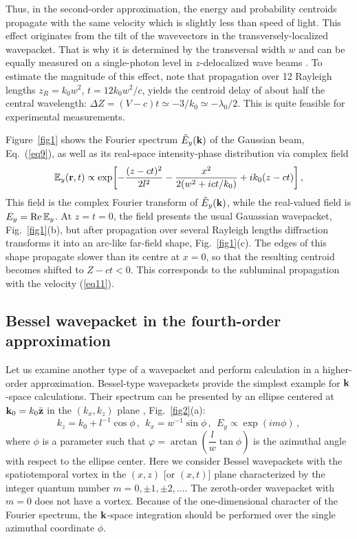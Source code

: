 \documentclass[12pt, a4paper, superscriptaddress, final]{iopart}
\begin{document}
Thus, in the second-order approximation, the energy and probability centroids propagate with the same velocity which is slightly less than speed of light. This effect originates from the tilt of the wavevectors in the transversely-localized wavepacket. That is why it is determined by the transversal width $w$ and can be equally measured on a single-photon level in $z$-delocalized wave beams \cite{Giovannini2015}.
To estimate the magnitude of this effect, note that propagation over 12 Rayleigh lengths $z_R = k_0 w^2$, $t = 12 k_0 w^2 / c$, yields the centroid delay of about half the central wavelength: $\Delta Z = (V-c)t \simeq - 3/ k_0 \simeq - \lambda_0/2$. This is quite feasible for experimental measurements.

Figure~\ref{fig1} shows the Fourier spectrum $\tilde{E}_y ({\bf k})$ of the Gaussian beam, Eq.~(\ref{eq9}), as well as its real-space intensity-phase distribution via complex field \cite{Siegman_book}
%
\begin{equation}
\label{eq12}
{\mathbb E}_y ({\bf r},t) \propto \exp\!\left[ -\frac{(z-ct)^2}{2 l^2} - \frac{x^2 }{2(w^2+i c t/k_0)} + i k_0 (z-ct)\right],
 \end{equation}
%	
This field is the complex Fourier transform of $\tilde{E}_y ({\bf k})$, while the real-valued field is $E_y = {\rm Re}\, {\mathbb E}_y$. At $z=t=0$, the field presents the usual Gauassian wavepacket, Fig.~\ref{fig1}(b), but after propagation over several Rayleigh lengths diffraction transforms it into an arc-like far-field shape, Fig.~\ref{fig1}(c). The edges of this shape propagate slower than its centre at $x=0$, so that the resulting centroid becomes shifted to $Z - ct < 0$. This corresponds to the subluminal propagation with the velocity (\ref{eq11}). 

\subsection{Bessel wavepacket in the fourth-order approximation}

Let us examine another type of a wavepacket and perform calculation in a higher-order approximation. Bessel-type wavepackets provide the simplest example for ${\bf k}$-space calculations. Their spectrum can be presented by an ellipse centered at ${\bf k}_0 = k_0 \bar{\bf z}$ in the $(k_x,k_z)$ plane \cite{Bliokh2023,Bliokh2021}, Fig.~\ref{fig2}(a):
%
\begin{equation}
\label{eq13}
k_z = k_0 + l^{-1} \cos \phi \,, ~~
k_x = w^{-1} \sin \phi \,, ~~
E_y \propto \exp(im\phi)\,,
\end{equation}
%  
where $\phi$ is a parameter such that $\varphi = \arctan\!\left(\dfrac{l}{w}\tan\phi\right)$ is the azimuthal angle with respect to the ellipse center. Here we consider Bessel wavepackets with the spatiotemporal vortex in the $(x,z)$ [or $(x,t)$] plane characterized by the integer quantum number $m = 0, \pm1, \pm 2, ...$. The zeroth-order wavepacket with $m =0$ does not have a vortex. 
Because of the one-dimensional character of the Fourier spectrum, the ${\bf k}$-space integration should be performed over the single azimuthal coordinate $\phi$.
\end{document}
